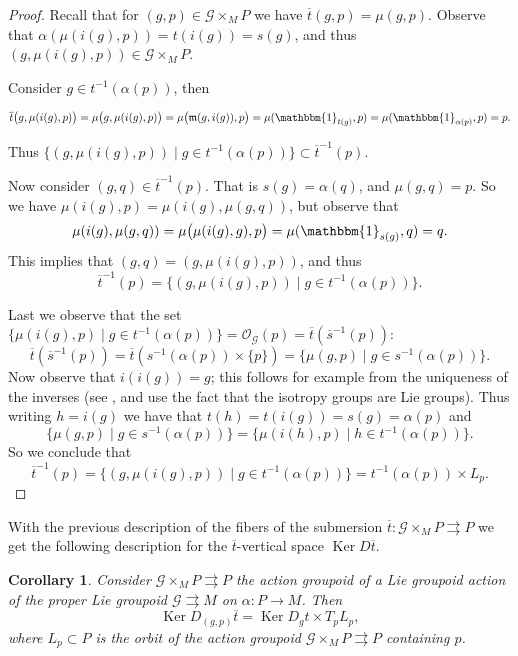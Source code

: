 \documentclass[12pt,a4paper,reqno]{amsart}
\DeclareMathOperator{\kernel}{Ker}
\newcommand{\1}{\mathbbm{1}} %
\newcommand{\G}{\mathcal{G}} %
\newcommand{\m}{\mathfrak{m}} %
\newcommand{\Or}{\mathcal{O}}
\newtheorem{cor}[thm]{Corollary}
\theoremstyle{definition}
\theoremstyle{TheoremNum}
\begin{document}
\begin{proof}
Recall that for $(g,p)\in\G\times_M P$ we have $\overline{t}(g,p) = \mu(g,p)$. Observe that \linebreak$\alpha(\mu(i(g),p)) = t(i(g)) = s(g)$, and thus $(g,\mu(i(g),p))\in \G\times_M P$. 

Consider $g\in t^{-1}(\alpha(p))$, then 
\begin{linenomath}
\begin{align*}
\overline{t}\big(g,\mu(i(g),p)\big) = \mu\big(g, \mu(i(g),p)\big) = \mu\big(\m(g,i(g)),p\big) = \mu(\1_{t(g)},p)= \mu(\1_{\alpha(p)},p) = p.
\end{align*}
\end{linenomath}
Thus $\{(g,\mu(i(g),p))\mid g\in t^{-1}(\alpha(p))\}\subset \overline{t}^{-1}(p)$.

Now consider $(g,q)\in \overline{t}^{-1}(p)$. That is $s(g) = \alpha(q)$, and $\mu(g,q) = p$. So we have $\mu(i(g),p) = \mu(i(g),\mu(g,q))$, but observe that  
\[
\mu(i(g),\mu(g,q))=\mu\big(\mu(i(g),g),p\big)= \mu(\1_{s(g)},q) = q.
\] 
This implies that $(g,q) = (g,\mu(i(g),p))$, and thus 
\[
\overline{t}^{-1}(p) = \{(g,\mu(i(g),p))\mid g\in t^{-1}(\alpha(p))\}.
\]

Last we observe that the set $\{\mu(i(g),p)\mid g\in t^{-1}(\alpha(p))\} = \Or_\G(p) = \overline{t}(\overline{s}^{-1}(p))$:
\[
\overline{t}(\overline{s}^{-1}(p)) = \overline{t}(s^{-1}(\alpha(p))\times\{p\}) = \{\mu(g,p)\mid g\in s^{-1}(\alpha(p))\}.
\]
Now observe that $i(i(g)) = g$; this follows for example from the uniqueness of the inverses (see \cite[Ex. 1.2, p. 9]{Meinrenken2017}, and  use the fact that the isotropy groups are Lie groups). Thus writing $h = i(g)$ we have that $t(h) = t(i(g)) = s(g) = \alpha(p)$ and 
\[
\{\mu(g,p)\mid g\in s^{-1}(\alpha(p))\} = \{\mu(i(h),p)\mid h\in t^{-1}(\alpha(p))\}.
\]
So we conclude that 
\[
\overline{t}^{-1}(p) = \{(g,\mu(i(g),p))\mid g\in t^{-1}(\alpha(p))\} = t^{-1}(\alpha(p))\times L_p.
\]
\end{proof}

With the previous description of the fibers of the submersion $\overline{t}\colon \G\times_M P\rightrightarrows P$ we get the following description for the $\overline{t}$-vertical space $\kernel D\overline{t}$.

\begin{cor}\th\label{C: Kernel of bar(t)}
Consider  $\G\times_M P\rightrightarrows P$ the action groupoid of a Lie groupoid  action of the proper Lie groupoid $\G\rightrightarrows M$ on $\alpha\colon P\to M$. Then
\[
\kernel D_{(g,p)}\overline{t} = \kernel D_gt \times T_{p}L_p,
\]
where $L_p\subset P$ is the orbit of the action groupoid $\G\times_M P\rightrightarrows P$ containing $p$.
\end{cor}
\end{document}
